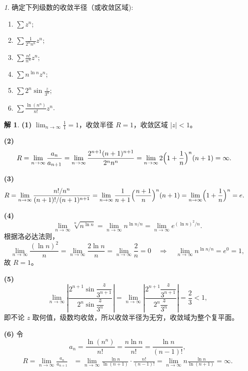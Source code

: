 \documentclass[11pt]{article}
\theoremstyle{remark}
\newtheorem{problem}{}
\theoremstyle{definition}
\newtheorem{solution}{解}
\begin{document}
\begin{problem}
确定下列级数的收敛半径（或收敛区域):
\begin{enumerate}
    \item $\sum z^n$;
    \item $\sum \frac{1}{2^n n^n} z^n$;
    \item $\sum \frac{n !}{n^n} z^n$;
    \item $\sum n^{\ln{n}} z^n$;
    \item $\sum 2^n \sin \frac{z}{3^n}$;
    \item $\sum \frac{\ln \left(n^n\right)}{n !} z^n$.
\end{enumerate}
\end{problem}

\begin{solution}
\textbf{(1)}
$\displaystyle\lim_{n\to\infty}\frac{1}{1}=1$，收敛半径 $R=1$，收敛区域 $|z|<1$。

\textbf{(2)}
\begin{align*}
R=\lim_{n\to\infty}\frac{a_{n}}{a_{n+1}}
&=\lim_{n\to\infty}\frac{2^{n+1}(n+1)^{n+1}}{2^{n}n^{n}}
=\lim_{n\to\infty}2\Bigl(1+\frac1n\Bigr)^{n}(n+1)=\infty.
\end{align*}

\textbf{(3)}
\begin{align*}
R=\lim_{n\to\infty}\frac{n!/n^{n}}{(n+1)!/(n+1)^{n+1}}
&=\lim_{n\to\infty}\frac{1}{n+1}\Bigl(\frac{n+1}{n}\Bigr)^{n}(n+1)
=\lim_{n\to\infty}\Bigl(1+\frac1n\Bigr)^{n}=e.
\end{align*}

\textbf{(4)}
\[
\lim_{n\to\infty}\sqrt[n]{n^{\ln n}}
=\lim_{n\to\infty}n^{\ln n/n}
=\lim_{n\to\infty}e^{(\ln n)^{2}/n}.
\]
根据洛必达法则，
\[
\lim_{n\to\infty}\frac{(\ln n)^{2}}{n}
=\lim_{n\to\infty}\frac{2\ln n}{n}
=\lim_{n\to\infty}\frac{2}{n}=0
\quad\Longrightarrow\quad
\lim_{n\to\infty}n^{\ln n/n}=e^{0}=1,
\]
故 $R=1$。

\textbf{(5)}
\[
\lim_{n\to\infty}\left|
\frac{2^{n+1}\sin\dfrac{z}{3^{n+1}}}{2^{n}\sin\dfrac{z}{3^{n}}}
\right|
=\lim_{n\to\infty}\left|
\frac{2^{n+1}\dfrac{z}{3^{n+1}}}{2^{n}\dfrac{z}{3^{n}}}
\right|
=\frac23<1,
\]
即不论 $z$ 取何值，级数均收敛，所以收敛半径为无穷，收敛域为整个复平面。

\textbf{(6)}
令
\[
a_{n}=\frac{\ln(n^{n})}{n!}=\frac{n\ln n}{n!}=\frac{\ln n}{(n-1)!},
\]
\begin{align*}
R=\lim_{n\to\infty}\frac{a_{n}}{a_{n+1}}
&=\lim_{n\to\infty}\frac{\ln n}{\ln(n+1)}\cdot\frac{n!}{(n-1)!}
=\lim_{n\to\infty}n\frac{\ln n}{\ln(n+1)}=\infty.
\end{align*}
\end{solution}
\end{document}
